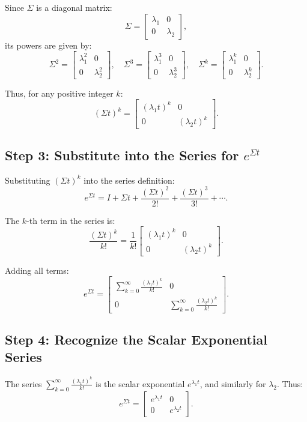 \documentclass[12pt]{article}
\begin{document}
Since \(\Sigma\) is a diagonal matrix:
\[
\Sigma = \begin{bmatrix} \lambda_1 & 0 \\ 0 & \lambda_2 \end{bmatrix},
\]
its powers are given by:
\[
\Sigma^2 = \begin{bmatrix} \lambda_1^2 & 0 \\ 0 & \lambda_2^2 \end{bmatrix}, \quad
\Sigma^3 = \begin{bmatrix} \lambda_1^3 & 0 \\ 0 & \lambda_2^3 \end{bmatrix}, \quad
\Sigma^k = \begin{bmatrix} \lambda_1^k & 0 \\ 0 & \lambda_2^k \end{bmatrix}.
\]

Thus, for any positive integer \(k\):
\[
(\Sigma t)^k = \begin{bmatrix} (\lambda_1 t)^k & 0 \\ 0 & (\lambda_2 t)^k \end{bmatrix}.
\]

\subsection*{Step 3: Substitute into the Series for \(e^{\Sigma t}\)}

Substituting \((\Sigma t)^k\) into the series definition:
\[
e^{\Sigma t} = I + \Sigma t + \frac{(\Sigma t)^2}{2!} + \frac{(\Sigma t)^3}{3!} + \cdots.
\]

The \(k\)-th term in the series is:
\[
\frac{(\Sigma t)^k}{k!} = \frac{1}{k!} \begin{bmatrix} (\lambda_1 t)^k & 0 \\ 0 & (\lambda_2 t)^k \end{bmatrix}.
\]

Adding all terms:
\[
e^{\Sigma t} = \begin{bmatrix} 
\sum_{k=0}^\infty \frac{(\lambda_1 t)^k}{k!} & 0 \\ 
0 & \sum_{k=0}^\infty \frac{(\lambda_2 t)^k}{k!}
\end{bmatrix}.
\]

\subsection*{Step 4: Recognize the Scalar Exponential Series}

The series \(\sum_{k=0}^\infty \frac{(\lambda_1 t)^k}{k!}\) is the scalar exponential \(e^{\lambda_1 t}\), and similarly for \(\lambda_2\). Thus:
\[
e^{\Sigma t} = \begin{bmatrix} e^{\lambda_1 t} & 0 \\ 0 & e^{\lambda_2 t} \end{bmatrix}.
\]
\end{document}
